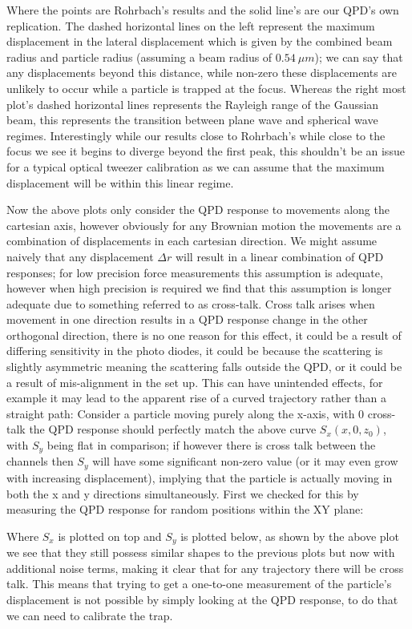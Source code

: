 \documentclass[a4paper,oneside,11pt]{book}
\begin{document}
Where the points are Rohrbach's results and the solid line's are our QPD's own replication. The dashed horizontal lines on the left represent the maximum displacement in the lateral displacement which is given by the combined beam radius and particle radius (assuming a beam radius of $0.54\ \mu m$); we can say that any displacements beyond this distance, while non-zero these displacements are unlikely to occur while a particle is trapped at the focus. Whereas the right most plot's dashed horizontal lines represents the Rayleigh range of the Gaussian beam, this represents the transition between plane wave and spherical wave regimes. Interestingly while our results close to Rohrbach's while close to the focus we see it begins to diverge beyond the first peak, this shouldn't be an issue for a typical optical tweezer calibration as we can assume that the maximum displacement will be within this linear regime. 

Now the above plots only consider the QPD response to movements along the cartesian axis, however obviously for any Brownian motion the movements are a combination of displacements in each cartesian direction. We might assume naively that any displacement $\Delta r$ will result in a linear combination of QPD responses; for low precision force measurements this assumption is adequate, however when high precision is required we find that this assumption is longer adequate due to something referred to as cross-talk. Cross talk arises when movement in one direction results in a QPD response change in the other orthogonal direction, there is no one reason for this effect, it could be a result of differing sensitivity in the photo diodes, it could be because the scattering is slightly asymmetric meaning the scattering falls outside the QPD, or it could be a result of mis-alignment in the set up. This can have unintended effects, for example it may lead to the apparent rise of a curved trajectory rather than a straight path: Consider a particle moving purely along the x-axis, with 0 cross-talk the QPD response should perfectly match the above curve $S_x(x,0,z_0)$, with $S_y$ being flat in comparison; if however there is cross talk between the channels then $S_y$ will have some significant non-zero value (or it may even grow with increasing displacement), implying that the particle is actually moving in both the x and y directions simultaneously.  First we checked for this by measuring the QPD response for random positions within the XY plane:

Where $S_x$ is plotted on top and $S_y$ is plotted below, as shown by the above plot we see that they still possess similar shapes to the previous plots but now with additional noise terms, making it clear that for any trajectory there will be cross talk. This means that trying to get a one-to-one measurement of the particle's displacement is not possible by simply looking at the QPD response, to do that we can need to calibrate the trap. 
\end{document}
